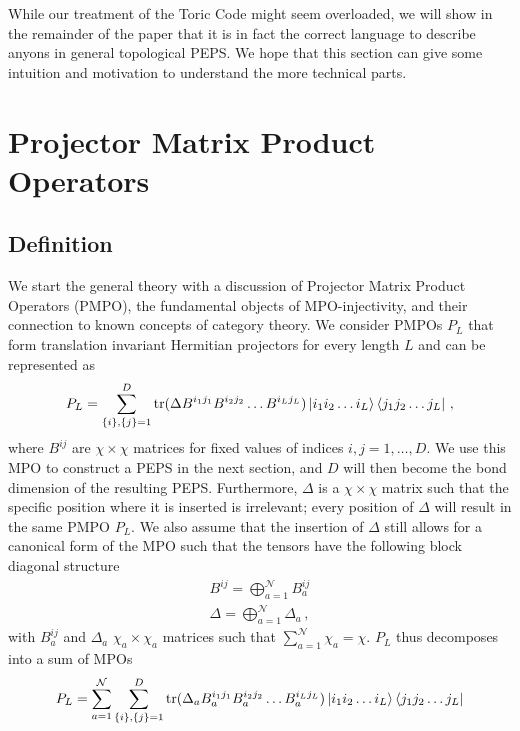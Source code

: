 \documentclass[12 pt]{article}
\begin{document}
While our treatment of the Toric Code might seem overloaded, we will show in the remainder of the paper that it is in fact the correct language to describe anyons in general topological PEPS. We hope that this section can give some intuition and motivation to understand the more technical parts.

\section{Projector Matrix Product Operators} \label{sec:MPO}
\vspace{3 mm}
\subsection{Definition}
\vspace{5 mm}
We start the general theory with a discussion of Projector Matrix Product Operators (PMPO), the fundamental objects of MPO-injectivity, and their connection to known concepts of category theory. We consider PMPOs $P_L$ that form translation invariant Hermitian projectors for every length $L$ and can be represented as
\begin{equation} \label{mpo}
    P_L =\sum_{\{i\}, \{j\} = 1}^{D}\text{tr}(\Delta B^{i_1j_1}B^{i_2j_2}\dots B^{i_Lj_L})\ket{i_1 i_2\dots i_L}\bra{j_1 j_2 \dots j_L}\, ,
\end{equation}
where $B^{ij}$ are $\chi \times \chi$ matrices for fixed values of indices $i,j=1,\ldots,D$. We use this MPO to construct a PEPS in the next section, and $D$ will then become the bond dimension of the resulting PEPS. Furthermore, $\Delta$ is a $\chi \times \chi$ matrix such that the specific position where it is inserted is irrelevant; every position of $\Delta$ will result in the same PMPO $P_L$. We also assume that the insertion of $\Delta$ still allows for a canonical form of the MPO such that the tensors have the following block diagonal structure \cite{MPSrepresentations}
\begin{align}
    B^{ij} = \bigoplus_{a = 1}^{\mathcal{N}} B_a^{ij}\\
    \Delta = \bigoplus_{a = 1}^{\mathcal{N}} \Delta_a\, ,
\end{align}
with $B_a^{ij}$ and $\Delta_a$ $\chi_a \times \chi_a$ matrices such that $\sum_{a = 1}^{\mathcal{N}} \chi_a = \chi$. $P_L$ thus decomposes into a sum of MPOs
\begin{equation}
    P_L =\sum_{a = 1}^{\mathcal{N}}\sum_{\{i\}, \{j\} = 1}^{D}\text{tr}(\Delta_a B_a^{i_1j_1}B_a^{i_2j_2}\dots B_a^{i_Lj_L})  \ket{i_1 i_2\dots i_L}\bra{j_1 j_2 \dots j_L}
\end{equation}
\end{document}
